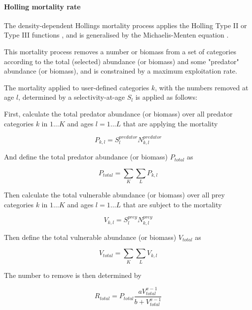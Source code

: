 \paragraph{Holling mortality rate}

The density-dependent Hollings mortality process applies the Holling Type II or Type III functions \citep{Holling1959}, and is generalised by the Michaelis-Menten equation \citep{MentenMichaelis1913}.

This mortality process removes a number or biomass from a set of categories according to the total (selected) abundance (or biomass) and some "predator" abundance (or biomass), and is constrained by a maximum exploitation rate.

The mortality applied to user-defined categories $k$, with the numbers removed at age $l$, determined by a selectivity-at-age $S_l$ is applied as follows:

First, calculate the total predator abundance (or biomass) over all predator categories $k$ in $1 \ldots K$ and ages $l = 1 \ldots L$ that are applying the mortality

\begin{equation}
	P_{k,l} = S^{predator}_l N^{predator}_{k,l}
\end{equation}

And define the total predator abundance (or biomass) $P_{total}$ as

\begin{equation}
	P_{total}  = \sum\limits_K {\sum\limits_L {P_{k,l}}}
\end{equation}

Then calculate the total vulnerable abundance (or biomass) over all prey categories $k$ in $1 \ldots K$ and ages $l = 1 \ldots L$ that are subject to the mortality

\begin{equation}
	V_{k,l} = S^{prey}_l N^{prey}_{k,l}
\end{equation}

Then define the total vulnerable abundance (or biomass) $V_{total}$ as

\begin{equation}
	V_{total}  = \sum\limits_K {\sum\limits_L {V_{k,l}}}
\end{equation}

The number to remove is then determined by

\begin{equation}
	R_{total} = P_{total} \frac{a  V_{total}^{x-1}}{b + V_{total}^{x-1}}
\end{equation}

